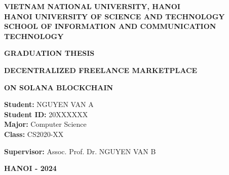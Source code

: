 \documentclass[a4paper,13pt,twoside]{report}
\title{\bf \TITLE}
\author{\AUTHOR}
\theoremstyle{definition}
\begin{document}
\begin{titlepage}
\begin{center}

\textbf{\large VIETNAM NATIONAL UNIVERSITY, HANOI}\\
\textbf{\large HANOI UNIVERSITY OF SCIENCE AND TECHNOLOGY}\\
\textbf{\large SCHOOL OF INFORMATION AND COMMUNICATION TECHNOLOGY}\\

\vspace{1cm}

\vspace{1.5cm}

\textbf{\Large GRADUATION THESIS}

\vspace{2cm}

\textbf{\LARGE DECENTRALIZED FREELANCE MARKETPLACE}

\textbf{\LARGE ON SOLANA BLOCKCHAIN}

\vspace{2.5cm}

\begin{flushleft}
\textbf{Student:} \hspace{2cm} NGUYEN VAN A\\
\textbf{Student ID:} \hspace{1.5cm} 20XXXXXX\\
\textbf{Major:} \hspace{2.3cm} Computer Science\\
\textbf{Class:} \hspace{2.5cm} CS2020-XX\\
\end{flushleft}

\vspace{1.5cm}

\begin{flushleft}
\textbf{Supervisor:} \hspace{1.3cm} Assoc. Prof. Dr. NGUYEN VAN B\\
\end{flushleft}

\vfill

\textbf{HANOI - 2024}

\end{center}
\end{titlepage}

\newpage
{}
\end{document}

